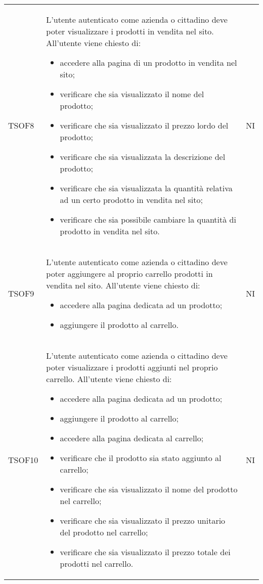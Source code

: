 \begin{longtable}{ >{\centering}p{} >{\centering}p{}
			>{\centering}p{}}
		\tabularnewline
		TSOF8	&	L'utente autenticato come azienda o cittadino deve poter visualizzare i
		prodotti in vendita nel sito. All'utente viene chiesto di:
		\begin{itemize}
			\item accedere alla pagina di un prodotto in vendita nel sito;
			\item verificare che sia visualizzato il nome del prodotto;
			\item verificare che sia visualizzato il prezzo lordo\glo{} del prodotto;
			\item verificare che sia visualizzata la descrizione del prodotto;
			\item verificare che sia visualizzata la quantità relativa ad un certo
			prodotto in vendita nel sito;
			\item verificare che sia possibile cambiare la quantità di prodotto in
			vendita nel sito.
		\end{itemize}	&	NI
		\tabularnewline
		
		TSOF9	&	L'utente autenticato come azienda o cittadino deve poter aggiungere
		al proprio carrello prodotti in vendita nel sito. All'utente viene chiesto di:
		\begin{itemize}
			\item accedere alla pagina dedicata ad un prodotto;
			\item aggiungere il prodotto al carrello.
		\end{itemize}	&	NI
	
		\tabularnewline
		TSOF10	&	L'utente autenticato come azienda o cittadino deve poter visualizzare i
		prodotti aggiunti nel proprio carrello. All'utente viene chiesto di:
		\begin{itemize}
			\item accedere alla pagina dedicata ad un prodotto;
			\item aggiungere il prodotto al carrello;
			\item accedere alla pagina dedicata al carrello;
			\item verificare che il prodotto sia stato aggiunto al carrello;
			\item verificare che sia visualizzato il nome del prodotto nel carrello;
			\item verificare che sia visualizzato il prezzo unitario del prodotto nel carrello;
			\item verificare che sia visualizzato il prezzo totale dei prodotti nel carrello.
		\end{itemize}	&	NI
		\tabularnewline
		

\end{longtable}
